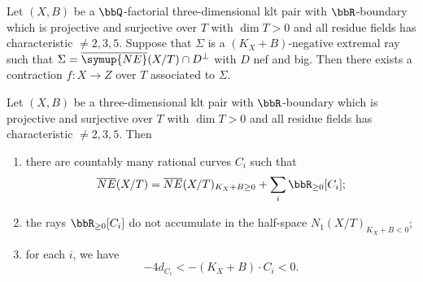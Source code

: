     \begin{lemma}[Corollary 9.18]\label{cor:contraction}
        Let \((X,B)\) be a \(\bbQ\)-factorial three-dimensional klt pair with \(\bbR\)-boundary which is projective and surjective over \(T\) with \(\dim T >0\) and all residue fields has characteristic \(\neq 2,3,5\).
        Suppose that \(\Sigma\) is a \((K_X+B)\)-negative extremal ray such that \(\Sigma = \overline{\symup{NE}}(X/T) \cap D^{\perp}\) with \(D\) nef and big.
        Then there exists a contraction \(f: X \to Z\) over \(T\) associated to \(\Sigma\).
    \end{lemma}

    \begin{theorem}\label{thm:cone_theorem}
        Let \((X,B)\) be a three-dimensional klt pair with \(\bbR\)-boundary which is projective and surjective over \(T\) with \(\dim T >0\) and all residue fields has characteristic \(\neq 2,3,5\).
        Then 
        \begin{enumerate}
            \item there are countably many rational curves \(C_i\) such that
                \[
                    \overline{NE}(X/T) = \overline{NE}(X/T)_{K_X + B \geq 0} + \sum_i \bbR_{\geq 0}[C_i];
                \]
            \item the rays \(\bbR_{\geq 0}[C_i]\) do not accumulate in the half-space \(N_1(X/T)_{K_X + B < 0}\);
            \item for each \(i\), we have 
                \[
                    -4d_{C_i} < -(K_X + B) \cdot C_i < 0.
                \]
        \end{enumerate}
    \end{theorem}

